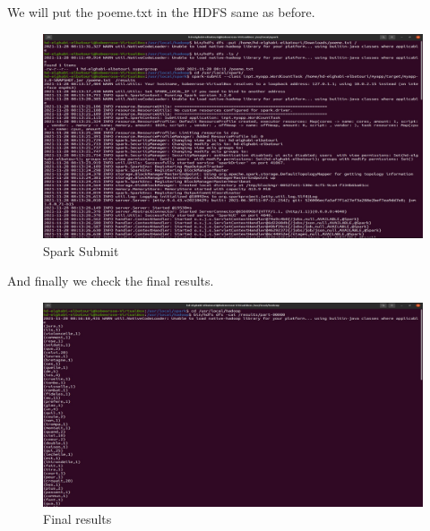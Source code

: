 \begin{spacing}{1.2}
\par We will put the poeme.txt in the HDFS same as before.
\\
\begin{figure}[!htb] 
\begin{center} 
\includegraphics[width=1\linewidth]{Big_Data/Spark/Running a Spark Batch app in Java/Spark Submit} 
\end{center} 
\caption{Spark Submit} 
\end{figure} 
\FloatBarrier
\par And finally we check the final results.
\\
\begin{figure}[!htb] 
\begin{center} 
\includegraphics[width=1\linewidth]{Big_Data/Spark/Running a Spark Batch app in Java/Final results} 
\end{center} 
\caption{Final results} 
\end{figure} 
\FloatBarrier



\end{spacing}
